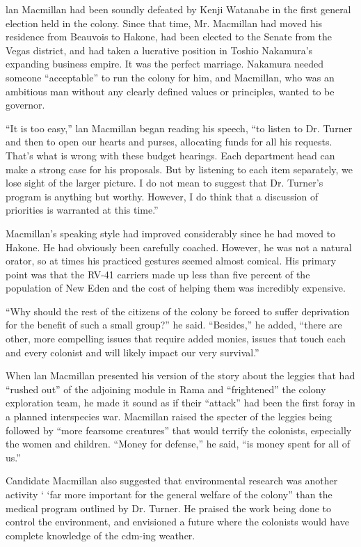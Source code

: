 \documentclass[]{article}
\begin{document}
{lan Macmillan had been soundly defeated by Kenji Watanabe in the first general election held in the colony. Since that time, Mr. Macmillan had moved his residence from Beauvois to Hakone, had been elected to the Senate from the Vegas district, and had taken a lucrative position in Toshio Nakamura’s expanding business empire. It was the perfect marriage. Nakamura needed someone “acceptable” to run the colony for him, and Macmillan, who was an ambitious man without any clearly defined values or principles, wanted to be governor.

“It is too easy,” lan Macmillan began reading his speech, “to listen to Dr. Turner and then to open our hearts and purses, allocating funds for all his requests. That’s what is wrong with these budget hearings. Each department head can make a strong case for his proposals. But by listening to each item separately, we lose sight of the larger picture. I do not mean to suggest that Dr. Turner’s program is anything but worthy. However, I do think that a discussion of priorities is warranted at this time.”

Macmillan’s speaking style had improved considerably since he had moved to Hakone. He had obviously been carefully coached. However, he was not a natural orator, so at times his practiced gestures seemed almost comical. His primary point was that the RV-41 carriers made up less than five percent of the population of New Eden and the cost of helping them was incredibly expensive.

“Why should the rest of the citizens of the colony be forced to suffer deprivation for the benefit of such a small group?” he said. “Besides,” he added, “there are other, more compelling issues that require added monies, issues that touch each and every colonist and will likely impact our very survival.”

When lan Macmillan presented his version of the story about the leggies that had “rushed out” of the adjoining module in Rama and “frightened” the colony exploration team, he made it sound as if their “attack” had been the first foray in a planned interspecies war. Macmillan raised the specter of the leggies being followed by “more fearsome creatures” that would terrify the colonists, especially the women and children. “Money for defense,” he said, “is money spent for all of us.”

Candidate Macmillan also suggested that environmental research was another activity ‘ ‘far more important for the general welfare of the colony” than the medical program outlined by Dr. Turner. He praised the work being done to control the environment, and envisioned a future where the colonists would have complete knowledge of the cdm-ing weather.

}
\end{document}
